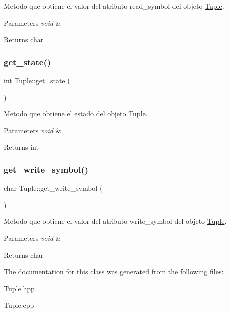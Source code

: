 Metodo que obtiene el valor del atributo \textquotesingle{}read\+\_\+symbol\textquotesingle{} del objeto \hyperlink{class_tuple}{Tuple}. 


\begin{DoxyParams}{Parameters}
{\em void} & \\
\hline
\end{DoxyParams}
\begin{DoxyReturn}{Returns}
char 
\end{DoxyReturn}
\hypertarget{class_tuple_abfc470f744b9f03a4934d19396d3fa7a}{}\label{class_tuple_abfc470f744b9f03a4934d19396d3fa7a} 
\subsubsection{\texorpdfstring{get\+\_\+state()}{get\_state()}}
{\footnotesize\ttfamily int Tuple\+::get\+\_\+state (\begin{DoxyParamCaption}\item[{void}]{ }\end{DoxyParamCaption})}



Metodo que obtiene el estado del objeto \hyperlink{class_tuple}{Tuple}. 


\begin{DoxyParams}{Parameters}
{\em void} & \\
\hline
\end{DoxyParams}
\begin{DoxyReturn}{Returns}
int 
\end{DoxyReturn}
\hypertarget{class_tuple_ad6d027648b6aee2ea637a24aac83fbc7}{}\label{class_tuple_ad6d027648b6aee2ea637a24aac83fbc7} 
\subsubsection{\texorpdfstring{get\+\_\+write\+\_\+symbol()}{get\_write\_symbol()}}
{\footnotesize\ttfamily char Tuple\+::get\+\_\+write\+\_\+symbol (\begin{DoxyParamCaption}\item[{void}]{ }\end{DoxyParamCaption})}



Metodo que obtiene el valor del atributo \textquotesingle{}write\+\_\+symbol\textquotesingle{} del objeto \hyperlink{class_tuple}{Tuple}. 


\begin{DoxyParams}{Parameters}
{\em void} & \\
\hline
\end{DoxyParams}
\begin{DoxyReturn}{Returns}
char 
\end{DoxyReturn}


The documentation for this class was generated from the following files\+:\begin{DoxyCompactItemize}
\item 
Tuple.\+hpp\item 
Tuple.\+cpp\end{DoxyCompactItemize}
